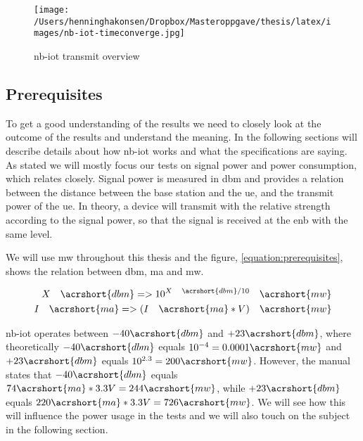 \documentclass[USenglish]{ifimaster}  %
\begin{document}
\begin{figure}[ht]
  \centering\texttt{[image: /Users/henninghakonsen/Dropbox/Masteroppgave/thesis/latex/images/nb-iot-timeconverge.jpg]}
  \caption[\acrshort{nb-iot} transmit overview]{\acrshort{nb-iot} transmit overview \cite{person:ola}}
  \label{figure:nb-iot-timeconverge}
\end{figure}

\subsection{Prerequisites} \label{ssection:prerequisites}
To get a good understanding of the results we need to closely look at the outcome of the results and understand the meaning. In the following sections will describe details about how \acrshort{nb-iot} works and what the specifications are saying. As stated we will mostly focus our tests on signal power and power consumption, which relates closely. Signal power is measured in \acrfull{dbm} and provides a relation between the distance between the base station and the \acrshort{ue}, and the transmit power of the \acrshort{ue}. In theory, a device will transmit with the relative strength according to the signal power, so that the signal is received at the \acrshort{enb} with the same level.

We will use \acrshort{mw} throughout this thesis and the figure, \vref{equation:prerequisites}, shows the relation between \acrfull{dbm}, \acrfull{ma} and \acrfull{mw}.

\begin{equation} \label{equation:prerequisites}
\begin{aligned}
  X\quad \acrshort{dbm} => 10^{X\quad \acrshort{dbm} / 10}\quad \acrshort{mw} \\
  I\quad \acrshort{ma} => (I\quad \acrshort{ma} * V)\quad \acrshort{mw} \\
\end{aligned}
\end{equation}

\acrshort{nb-iot} operates between ${-40 \acrshort{dbm}}$ and ${+23 \acrshort{dbm}}$, where theoretically ${-40 \acrshort{dbm}}$ equals ${10^{-4} = 0.0001 \acrshort{mw}}$ and ${+23 \acrshort{dbm}}$ equals ${10^{2.3} = 200 \acrshort{mw}}$.
However, the manual states that ${-40 \acrshort{dbm}}$ equals ${74 \acrshort{ma} * 3.3V = 244 \acrshort{mw}}$, while ${+23 \acrshort{dbm}}$ equals ${220 \acrshort{ma} * 3.3V = 726 \acrshort{mw}}$. We will see how this will influence the power usage in the tests and we will also touch on the subject in the following section.
\end{document}
